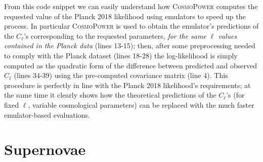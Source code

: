 From this code snippet we can easily understand how \textsc{CosmoPower} computes the requested value of the Planck 2018 likelihood using emulators to speed up the process. In particular \textsc{CosmoPower} is used to obtain the emulator's predictions of the $C_\ell$'s corresponding to the requested parameters, \emph{for the same $\ell$ values contained in the Planck data} (lines 13-15); then, after some preprocessing needed to comply with the Planck dataset (lines 18-28) the log-likelihood is simply computed as the quadratic form of the difference between predicted and observed $C_\ell$ (lines 34-39) using the pre-computed covariance matrix (line 4).
This procedure is perfectly in line with the Planck 2018 likelihood's requirements; at the same time it clearly shows how the theoretical predictions of the $C_\ell$'s (for fixed $\ell$, variable cosmological parameters) can be replaced with the much faster emulator-based evaluations.


\section{Supernovae}

